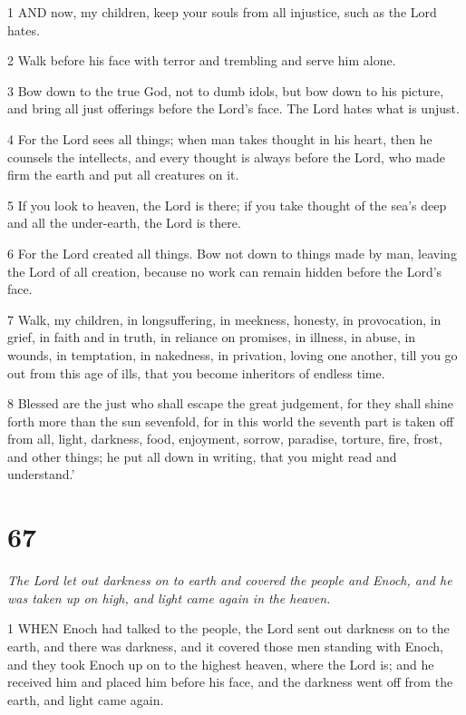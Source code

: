 \par 1 AND now, my children, keep your souls from all injustice, such as the Lord hates.

\par 2 Walk before his face with terror and trembling and serve him alone.

\par 3 Bow down to the true God, not to dumb idols, but bow down to his picture, and bring all just offerings before the Lord's face. The Lord hates what is unjust.

\par 4 For the Lord sees all things; when man takes thought in his heart, then he counsels the intellects, and every thought is always before the Lord, who made firm the earth and put all creatures on it.

\par 5 If you look to heaven, the Lord is there; if you take thought of the sea's deep and all the under-earth, the Lord is there.

\par 6 For the Lord created all things. Bow not down to things made by man, leaving the Lord of all creation, because no work can remain hidden before the Lord's face.

\par 7 Walk, my children, in longsuffering, in meekness, honesty, in provocation, in grief, in faith and in truth, in reliance on promises, in illness, in abuse, in wounds, in temptation, in nakedness, in privation, loving one another, till you go out from this age of ills, that you become inheritors of endless time.

\par 8 Blessed are the just who shall escape the great judgement, for they shall shine forth more than the sun sevenfold, for in this world the seventh part is taken off from all, light, darkness, food, enjoyment, sorrow, paradise, torture, fire, frost, and other things; he put all down in writing, that you might read and understand.'

\chapter{67}

\par \textit{The Lord let out darkness on to earth and covered the people and Enoch, and he was taken up on high, and light came again in the heaven.}

\par 1 WHEN Enoch had talked to the people, the Lord sent out darkness on to the earth, and there was darkness, and it covered those men standing with Enoch, and they took Enoch up on to the highest heaven, where the Lord is; and he received him and placed him before his face, and the darkness went off from the earth, and light came again.

